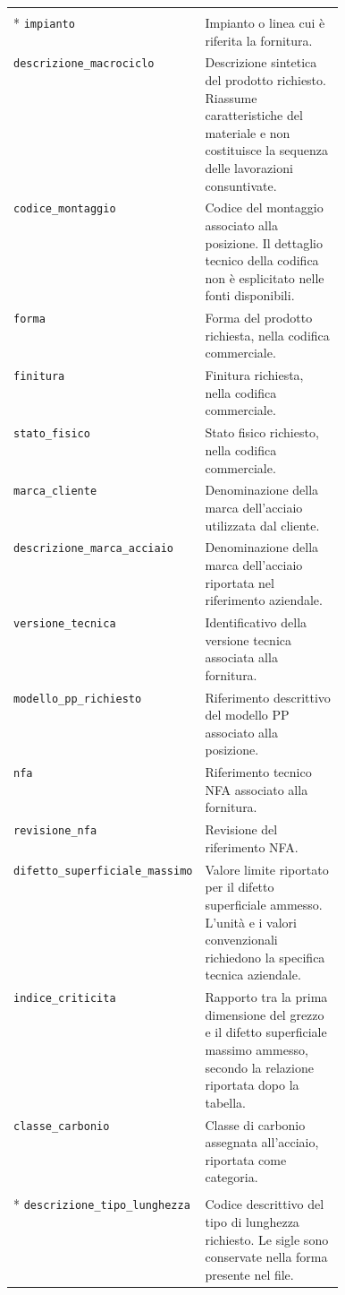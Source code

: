 \begin{longtable}{@{}p{0.43\linewidth}p{}@{}}
\addlinespace[5pt]
\multicolumn{2}{@{}l}{\small\bfseries\color{ReportBlue} Caratteristiche del prodotto}\\*
\addlinespace[2pt]
\texttt{impianto} & Impianto o linea cui è riferita la fornitura. \\
\texttt{descrizione\_macrociclo} & Descrizione sintetica del prodotto richiesto. Riassume caratteristiche del materiale e non costituisce la sequenza delle lavorazioni consuntivate. \\
\texttt{codice\_montaggio} & Codice del montaggio associato alla posizione. Il dettaglio tecnico della codifica non è esplicitato nelle fonti disponibili. \\
\texttt{forma} & Forma del prodotto richiesta, nella codifica commerciale. \\
\texttt{finitura} & Finitura richiesta, nella codifica commerciale. \\
\texttt{stato\_fisico} & Stato fisico richiesto, nella codifica commerciale. \\
\texttt{marca\_cliente} & Denominazione della marca dell'acciaio utilizzata dal cliente. \\
\texttt{descrizione\_marca\_acciaio} & Denominazione della marca dell'acciaio riportata nel riferimento aziendale. \\
\texttt{versione\_tecnica} & Identificativo della versione tecnica associata alla fornitura. \\
\texttt{modello\_pp\_richiesto} & Riferimento descrittivo del modello PP associato alla posizione. \\
\texttt{nfa} & Riferimento tecnico NFA associato alla fornitura. \\
\texttt{revisione\_nfa} & Revisione del riferimento NFA. \\
\texttt{difetto\_superficiale\_massimo} & Valore limite riportato per il difetto superficiale ammesso. L'unità e i valori convenzionali richiedono la specifica tecnica aziendale. \\
\texttt{indice\_criticita} & Rapporto tra la prima dimensione del grezzo e il difetto superficiale massimo ammesso, secondo la relazione riportata dopo la tabella. \\
\texttt{classe\_carbonio} & Classe di carbonio assegnata all'acciaio, riportata come categoria. \\
\addlinespace[5pt]
\multicolumn{2}{@{}l}{\small\bfseries\color{ReportBlue} Dimensioni e tolleranze}\\*
\addlinespace[2pt]
\texttt{descrizione\_tipo\_lunghezza} & Codice descrittivo del tipo di lunghezza richiesto. Le sigle sono conservate nella forma presente nel file. \\

\end{longtable}

